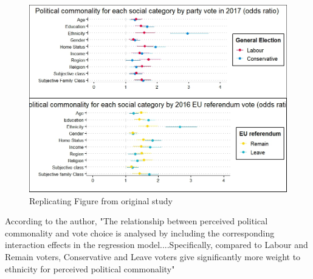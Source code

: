\documentclass{article}
\begin{document}
\begin{figure} [H] 
    \centering
    \includegraphics[width=1.3\textwidth]{Figure 3.jpeg}
    \caption{Replicating Figure from original study}
    \label{fig:enter-label}
\end{figure}


According to the author, "The relationship between perceived political commonality and vote choice is analysed by including the corresponding interaction effects in the regression model....Specifically, compared to Labour and Remain voters, Conservative and Leave voters give significantly more weight to ethnicity for perceived
political commonality"
\end{document}
